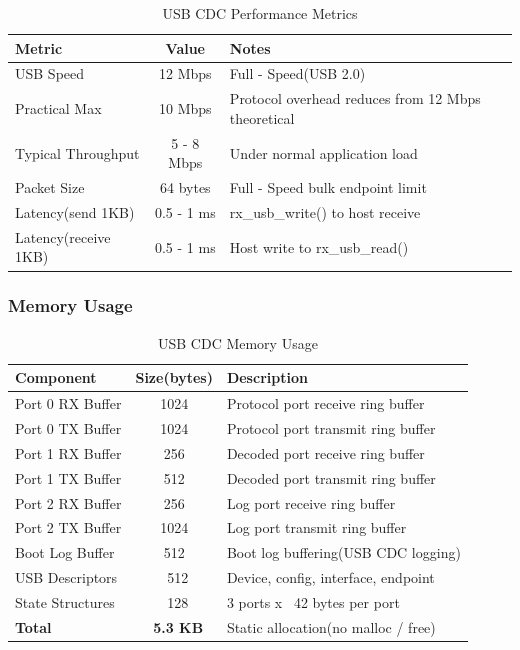 \begin{table}[h]
\centering
\begin{tabular} { | l | c | p{6cm} |}
\hline
\textbf{Metric} & \textbf{Value} & \textbf{Notes}
\\
\hline USB Speed & 12 Mbps &Full - Speed(USB 2.0) \\
Practical Max &
    10 Mbps &Protocol overhead reduces from
    12 Mbps theoretical \\
Typical Throughput
    & 5 - 8 Mbps &Under normal application load \\
Packet Size &
    64 bytes &Full - Speed bulk endpoint limit \\
Latency(send 1KB) &
    0.5 - 1 ms &rx\_usb\_write() to host receive \\
Latency(receive 1KB) &
    0.5 - 1 ms &Host write to rx\_usb\_read() \\
\hline
\end{tabular}
\caption { USB CDC Performance Metrics}
\label {
tab:
  usb_performance
}
\end{table}

\subsubsection{Memory Usage}

\begin{table}[h]
\centering
\begin{tabular} { | l | c | p{6cm} |}
\hline
\textbf{Component} & \textbf{Size(bytes)} & \textbf{Description}
\\
\hline Port 0 RX Buffer & 1024 &
    Protocol port receive ring buffer \\
Port 0 TX Buffer & 1024 &
    Protocol port transmit ring buffer \\
Port 1 RX Buffer & 256 &
    Decoded port receive ring buffer \\
Port 1 TX Buffer & 512 &
    Decoded port transmit ring buffer \\
Port 2 RX Buffer & 256 &
    Log port receive ring buffer \\
Port 2 TX Buffer & 1024 &
    Log port transmit ring buffer \\
Boot Log Buffer & 512 &
    Boot log buffering(USB CDC logging) \\
USB Descriptors & ~512 & Device,
    config, interface,
    endpoint \\
State Structures & ~128 & 3 ports x ~42 bytes per port \\
\hline
\textbf{Total} & \textbf{~5.3 KB} & Static allocation(no malloc / free) \\
\hline
\end{tabular}
\caption { USB CDC Memory Usage}
\label {
tab:
  usb_memory
}
\end{table}

